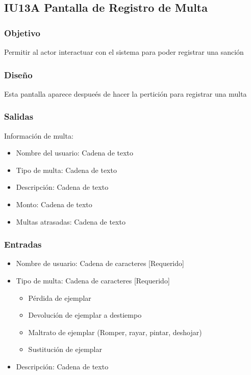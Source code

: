 \newpage
\subsection{IU13A Pantalla de Registro de Multa}

\subsubsection{Objetivo}
	Permitir al actor interactuar con el sistema para poder registrar una sanción 

\subsubsection{Diseño}
	Esta pantalla aparece despueés de hacer la pertición para registrar una multa


\subsubsection{Salidas}
	\begin{Citemize}
	        \item Información de multa:
	        \begin{itemize}
	        	\item Nombre del usuario: Cadena de texto
	        	\item Tipo de multa: Cadena de texto
		       	\item Descripción: Cadena de texto
		   		\item Monto: Cadena de texto
	    		\item Multas atrasadas: Cadena de texto
	       	\end{itemize}
	\end{Citemize}
	
\subsubsection{Entradas}
		\begin{itemize}
        	\item Nombre de usuario: Cadena de caracteres [Requerido]
        	\item Tipo de multa: Cadena de caracteres [Requerido]
        		\begin{itemize}
        			\item Pérdida de ejemplar
        			\item Devolución de ejemplar a destiempo
        			\item Maltrato de ejemplar (Romper, rayar, pintar, deshojar)
        			\item Sustitución de ejemplar
        		\end{itemize} 
	        \item Descripción: Cadena de texto
        \end{itemize}  
